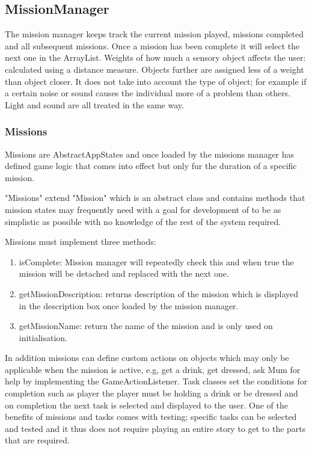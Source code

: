 \documentclass[11pt]{report}
\begin{document}
\subsection{MissionManager}
The mission manager keeps track the current mission played, missions completed and all subsequent missions. Once a mission has been complete it will select the next one in the ArrayList. Weights of how much a sensory object affects the user: calculated using a distance measure. Objects further are assigned less of a weight than object closer. It does not take into account the type of object; for example if a certain noise or sound causes the individual more of a problem than others. Light and sound are all treated in the same way.

\subsubsection*{Missions}
Missions are AbstractAppStates and once loaded by the missions manager has defined game logic that comes into effect but only fur the duration of a specific mission. 

"Missions" extend "Mission" which is an abstract class and contains methods that mission states may frequently need with a goal for development of to be as simplistic as possible with no knowledge of the rest of the system required.

Missions must implement three methods:
\begin{enumerate}
\item isComplete: Mission manager will repeatedly check this and when true the mission will be detached and replaced with the next one. 
\item getMissionDescription: returns description of the mission which is displayed in the description box once loaded by the mission manager. 
\item getMissionName: return the name of the mission and is only used on initialisation. 
\end{enumerate}

In addition missions can define custom actions on objects which may only be applicable when the mission is active, e.g, get a drink, get dressed, ask Mum for help by implementing the GameActionListener. Task classes set the conditions for completion such as player the player must be holding a drink or be dressed and on completion the next task is selected and displayed to the user. One of the benefits of missions and tasks comes with testing; specific tasks can be selected and tested and it thus does not require playing an entire story to get to the parts that are required.
\end{document}
